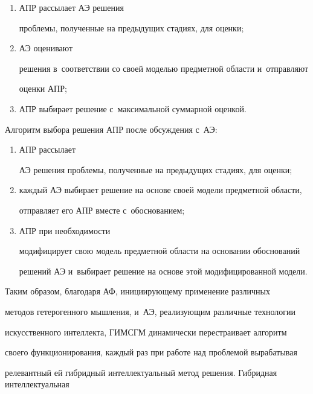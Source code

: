   \begin{enumerate}[(1)]


  \item АПР рассылает АЭ решения 


проблемы, полученные на предыдущих стадиях, для оценки; 


\item АЭ оценивают 


решения в~соответствии со своей моделью предметной области и~отправляют 


оценки АПР; 


\item АПР выбирает решение с~максимальной суммарной оценкой.


\end{enumerate}


  


  Алгоритм выбора решения АПР после обсуждения с~АЭ: 


  \begin{enumerate}[(1)]


  \item АПР рассылает 


АЭ решения проблемы, полученные на предыдущих стадиях, для оценки; 


\item каждый АЭ выбирает решение на основе своей модели предметной области, 


отправляет его АПР вместе с~обоснованием;


\item АПР при необходимости 


модифицирует свою модель предметной области на основании обоснований 


решений АЭ и~выбирает решение на основе этой модифицированной модели.


\end{enumerate}


  


  Таким образом, благодаря АФ, инициирующему применение различных 


методов гетерогенного мышления, и~АЭ, реализующим различные технологии 


искусственного интеллекта, ГИМСГМ динамически перестраивает алгоритм 


своего функционирования, каждый раз при работе над проблемой вырабатывая 


релевантный ей гибридный интеллектуальный метод решения. Гиб\-рид\-ная интеллектуальная 


